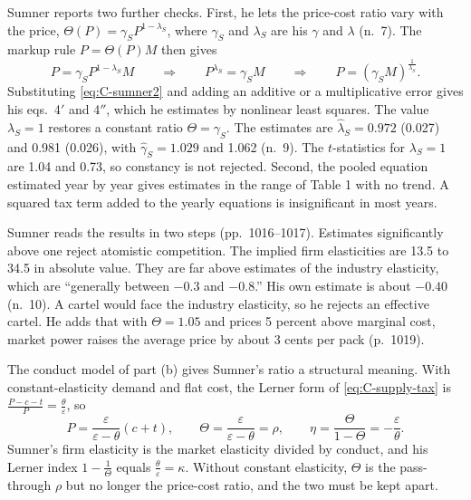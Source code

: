 Sumner reports two further checks. First, he lets the price-cost ratio vary with the price,
$\Theta(P) = \gamma_SP^{1 - \lambda_S}$, where $\gamma_S$ and $\lambda_S$ are his $\gamma$ and $\lambda$ (n.~7). The
markup rule $P = \Theta(P)M$ then gives
\begin{equation*}
P = \gamma_SP^{1 - \lambda_S}M
\qquad\Longrightarrow\qquad
P^{\lambda_S} = \gamma_SM
\qquad\Longrightarrow\qquad
P = (\gamma_SM)^{\frac{1}{\lambda_S}} .
\end{equation*}
Substituting \eqref{eq:C-sumner2} and adding an additive or a multiplicative error gives his eqs.~4$'$ and 4$''$,
which he estimates by nonlinear least squares. The value $\lambda_S = 1$ restores a constant ratio
$\Theta = \gamma_S$. The estimates are $\hat\lambda_S = 0.972$ (0.027) and 0.981 (0.026), with
$\hat\gamma_S = 1.029$ and 1.062 (n.~9). The $t$-statistics for $\lambda_S = 1$ are 1.04 and 0.73, so constancy is
not rejected. Second, the pooled equation estimated year by year gives estimates in the range of Table 1 with no
trend. A squared tax term added to the yearly equations is insignificant in most years.

Sumner reads the results in two steps (pp.~1016--1017). Estimates significantly above one reject atomistic competition. The
implied firm elasticities are 13.5 to 34.5 in absolute value. They are far above estimates of the industry elasticity,
which are ``generally between $-0.3$ and $-0.8$.'' His own estimate is about $-0.40$ (n.~10). A cartel would face the
industry elasticity, so he rejects an effective cartel. He adds that with $\Theta = 1.05$ and prices 5 percent above
marginal cost, market power raises the average price by about 3 cents per pack (p.~1019).

The conduct model of part (b) gives Sumner's ratio a structural meaning. With constant-elasticity demand and flat
cost, the Lerner form of \eqref{eq:C-supply-tax} is $\frac{P - c - t}{P} = \frac{\theta}{\varepsilon}$, so
\begin{equation*}
P = \frac{\varepsilon}{\varepsilon - \theta}(c + t), \qquad
\Theta = \frac{\varepsilon}{\varepsilon - \theta} = \rho, \qquad
\eta = \frac{\Theta}{1 - \Theta} = -\frac{\varepsilon}{\theta} .
\end{equation*}
Sumner's firm elasticity is the market elasticity divided by conduct, and his Lerner index $1 - \frac{1}{\Theta}$
equals $\frac{\theta}{\varepsilon} = \kappa$. Without constant elasticity, $\Theta$ is the pass-through $\rho$ but no
longer the price-cost ratio, and the two must be kept apart.

